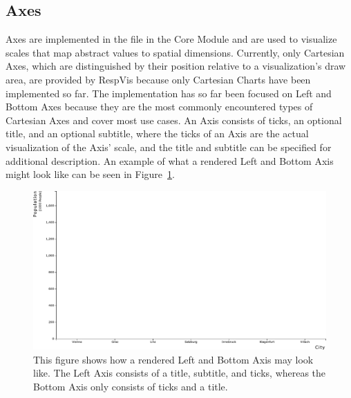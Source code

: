 \subsection{Axes}

Axes are implemented in the  file in the Core Module and
are used to visualize scales that map abstract values to spatial
dimensions.  Currently, only Cartesian Axes, which are distinguished
by their position relative to a visualization's draw area, are
provided by RespVis because only Cartesian Charts have been
implemented so far.  The implementation has so far been focused on
Left and Bottom Axes because they are the most commonly encountered
types of Cartesian Axes and cover most use cases.  An Axis consists of
ticks, an optional title, and an optional subtitle, where the ticks of
an Axis are the actual visualization of the Axis' scale, and the title
and subtitle can be specified for additional description.  An example
of what a rendered Left and Bottom Axis might look like can be seen in
Figure~\ref{fig:Axes}.

\begin{figure}[tp]
\centering
\includegraphics[keepaspectratio,width=\linewidth,height=\fullh]
{diagrams/axes.pdf}
\caption[RespVis Axis Components]{%
This figure shows how a rendered Left and Bottom Axis may look like.
The Left Axis consists of a title, subtitle, and ticks, whereas the
Bottom Axis only consists of ticks and a title.    }
\label{fig:Axes}
\end{figure}
  

